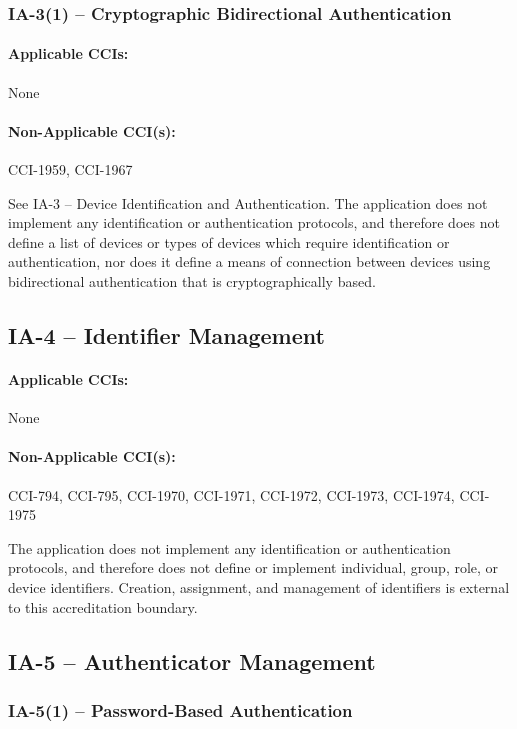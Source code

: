 \documentclass[letterpaper, 10pt, twoside]{article}
\begin{document}
\subsubsection{IA-3(1) -- Cryptographic Bidirectional Authentication}

\paragraph{Applicable CCIs:} None

\paragraph{Non-Applicable CCI(s):} CCI-1959, CCI-1967

See IA-3 – Device Identification and Authentication. The application does not implement any identification or authentication protocols, and therefore does not define a list of devices or types of devices which require identification or authentication, nor does it define a means of connection between devices using bidirectional authentication that is cryptographically based.

\subsection{IA-4 -- Identifier Management}

\paragraph{Applicable CCIs:} None

\paragraph{Non-Applicable CCI(s):} CCI-794, CCI-795, CCI-1970, CCI-1971, CCI-1972, CCI-1973, CCI-1974, CCI-1975

The application does not implement any identification or authentication protocols, and therefore does not define or implement individual, group, role, or device identifiers. Creation, assignment, and management of identifiers is external to this accreditation boundary.

\subsection{IA-5 -- Authenticator Management}

\subsubsection{IA-5(1) -- Password-Based Authentication}
\end{document}
